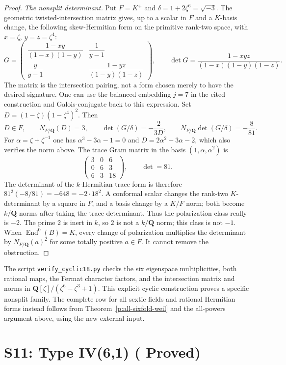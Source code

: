 \documentclass[10pt,reqno]{article}
\theoremstyle{emphasizedplain}
\DeclareRobustCommand{\provedstatus}{%
  \texorpdfstring{\textcolor{ProvedGreen}{\textbf{Proved}}}{Proved}}
\theoremstyle{emphasizeddefinition}
\theoremstyle{emphasizeddefinition}
\DeclareMathOperator{\End}{End}
\newcommand{\Q}{\mathbf Q}
\begin{document}
\begin{proof}
\emph{The nonsplit determinant.}
Put $F=K^+$ and $\delta=1+2\zeta^6=\sqrt{-3}$.
The geometric twisted-intersection matrix
\cite[Proposition 7.4]{YuZheng} gives, up to a scalar in $F$
and a $K$-basis change, the following skew-Hermitian form on
the primitive rank-two space, with $x=\zeta$, $y=z=\zeta^4$:
\[
 G=\begin{pmatrix}
 \dfrac{1-xy}{(1-x)(1-y)}&\dfrac1{y-1}\\[6pt]
 \dfrac{y}{y-1}&\dfrac{1-yz}{(1-y)(1-z)}
 \end{pmatrix},\qquad
 \det G=\frac{1-xyz}{(1-x)(1-y)(1-z)}.
\]
The matrix is the intersection pairing, not a form chosen merely
to have the desired signature. One can use the balanced embedding
$j=7$ in the cited construction and Galois-conjugate back to this
expression. Set $D=(1-\zeta)(1-\zeta^4)^2$. Then
\[
 D\in F,\qquad N_{F/\Q}(D)=3,\qquad
 \det(G/\delta)=-\frac2{3D},\qquad
 N_{F/\Q}\det(G/\delta)=-\frac8{81}.
\]
For $\alpha=\zeta+\zeta^{-1}$ one has
$\alpha^3-3\alpha-1=0$ and $D=2\alpha^2-3\alpha-2$,
which also verifies the norm above. The trace Gram matrix in the basis
$(1,\alpha,\alpha^2)$ is
\[
 \begin{pmatrix}3&0&6\\0&6&3\\6&3&18\end{pmatrix},
 \qquad \det=81.
\]
The determinant of the $k$-Hermitian trace form is therefore
$81^2(-8/81)=-648=-2\cdot18^2$. A conformal scalar changes the
rank-two $K$-determinant by a square in $F$, and a basis change
by a $K/F$ norm; both become $k/\Q$ norms after taking the trace
determinant. Thus the polarization class really is $-2$.
The prime $2$ is inert in $k$, so $2$ is not a $k/\Q$ norm;
this class is not $-1$. When $\End^0(B)=K$, every change of
polarization multiplies the determinant by $N_{F/\Q}(a)^2$
for some totally positive $a\in F$. It cannot remove the obstruction.
\end{proof}

The script \texttt{verify\_cyclic18.py} checks the six eigenspace
multiplicities, both rational maps, the Fermat character factors,
and the intersection matrix and norms in $\Q[\zeta]/(\zeta^6-\zeta^3+1)$.
This explicit cyclic construction proves a specific nonsplit family.
The complete row for all sextic fields and rational Hermitian forms
instead follows from Theorem~\ref{p:all-sixfold-weil} and the
all-powers argument above, using the new external input.

\section{S11: Type IV(6,1) (\provedstatus)}\label{sec:S11}
\end{document}
